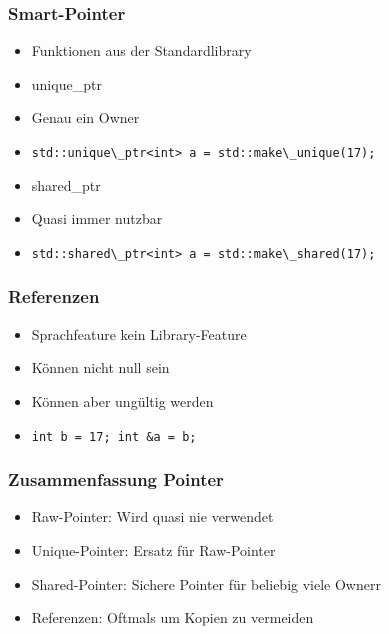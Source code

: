 \documentclass[aspectratio=169]{beamer}
\begin{document}
\begin{frame}
    \frametitle{Smart-Pointer}
    \begin{itemize}
        \item Funktionen aus der Standardlibrary
            \pause
        \item unique\_ptr 
            \pause
        \item Genau ein Owner
            \pause
        \item
            \lstinline{std::unique\_ptr<int> a = std::make\_unique(17);}
            \pause
        \item shared\_ptr 
            \pause
        \item Quasi immer nutzbar
        \item
            \lstinline{std::shared\_ptr<int> a = std::make\_shared(17);}
    \end{itemize}
\end{frame}

\begin{frame}
    \frametitle{Referenzen}
    \begin{itemize}
        \item Sprachfeature kein Library-Feature
            \pause
        \item Können nicht null sein
            \pause
        \item Können aber ungültig werden
        \item
            \lstinline{int b = 17; int &a = b;}
    \end{itemize}
\end{frame}

\begin{frame}
    \frametitle{Zusammenfassung Pointer}
    \begin{itemize}
        \item Raw-Pointer: Wird quasi nie verwendet
            \pause
        \item Unique-Pointer: Ersatz für Raw-Pointer
            \pause
        \item Shared-Pointer: Sichere Pointer für beliebig viele Ownerr
            \pause
        \item Referenzen: Oftmals um Kopien zu vermeiden
    \end{itemize}
\end{frame}
\end{document}
